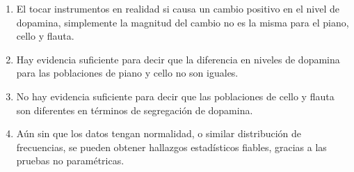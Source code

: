 \begin{enumerate}
    \item El tocar instrumentos en realidad si causa un cambio positivo en el nivel de dopamina, simplemente la magnitud del cambio no es la misma para el piano, cello y flauta.
    \item Hay evidencia suficiente para decir que la diferencia en niveles de dopamina para las  poblaciones de piano y cello no son iguales.
    \item No hay evidencia suficiente para decir que las poblaciones de cello y flauta son diferentes en términos de segregación de dopamina. 
    \item Aún sin que los datos tengan normalidad, o similar distribución de frecuencias, se pueden obtener hallazgos estadísticos fiables, gracias a las pruebas no paramétricas. 
\end{enumerate}

